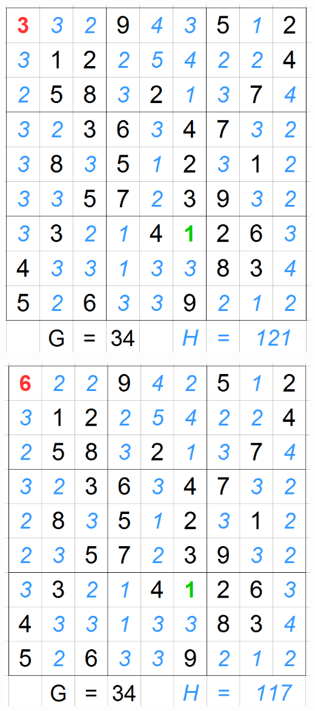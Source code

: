 \begin{frame}

\begin{minipage}{.45\textwidth}

\includegraphics[scale=0.2]{images/ASTARExample/2_1.png}

\includegraphics[scale=0.2]{images/ASTARExample/2_2.png}


\end{minipage}
\end{frame}
